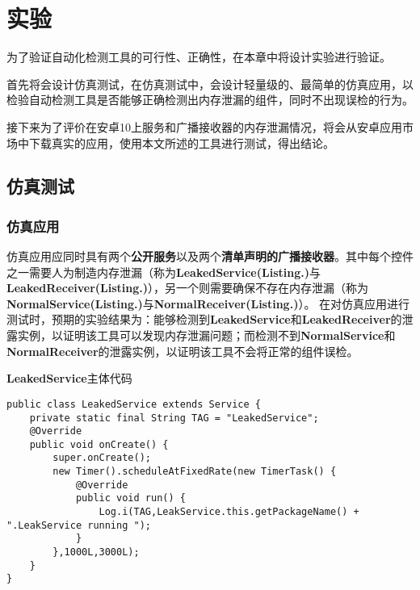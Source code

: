 
\chapter{实验}\label{chapter_experiment}
为了验证自动化检测工具的可行性、正确性，在本章中将设计实验进行验证。

首先将会设计仿真测试，在仿真测试中，会设计轻量级的、最简单的仿真应用，以检验自动检测工具是否能够正确检测出内存泄漏的组件，同时不出现误检的行为。

接下来为了评价在安卓10上服务和广播接收器的内存泄漏情况，将会从安卓应用市场中下载真实的应用，使用本文所述的工具进行测试，得出结论。
\section{仿真测试}

\subsection{仿真应用}

仿真应用应同时具有两个\textbf{公开服务}以及两个\textbf{清单声明的广播接收器}。其中每个控件之一需要人为制造内存泄漏（称为\textbf{LeakedService(Listing.\redbf{\ref{code:LeakedService}})}与\textbf{LeakedReceiver(Listing.\redbf{\ref{code:LeakedReceiver}})}），另一个则需要确保不存在内存泄漏（称为\textbf{NormalService(Listing.\redbf{\ref{code:Normal}})}与\textbf{NormalReceiver(Listing.\redbf{\ref{code:Normal}})}）。
在对仿真应用进行测试时，预期的实验结果为：能够检测到\textbf{LeakedService}和\textbf{LeakedReceiver}的泄露实例，以证明该工具可以发现内存泄漏问题；而检测不到\textbf{NormalService}和\textbf{NormalReceiver}的泄露实例，以证明该工具不会将正常的组件误检。


\begin{listing}[htbp]
	\centering
	\caption{\textbf{LeakedService}主体代码}
	\begin{verbatim}
public class LeakedService extends Service {
	private static final String TAG = "LeakedService";
	@Override
	public void onCreate() {
		super.onCreate();
		new Timer().scheduleAtFixedRate(new TimerTask() {
			@Override
			public void run() {
				Log.i(TAG,LeakService.this.getPackageName() + ".LeakService running ");
			}
		},1000L,3000L);
	}
}	
	\end{verbatim}
	\label{code:LeakedService}
\end{listing}

